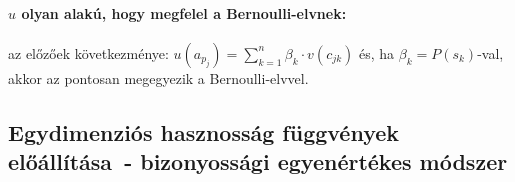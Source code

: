 \documentclass[a4paper,12pt]{article}
\begin{document}
\paragraph{$u$ olyan alakú, hogy megfelel a Bernoulli-elvnek:} az előzőek következménye: $u(a_{p_j}) = \sum^n_{k=1} \beta_k \cdot  v(c_{jk})$ és, ha $\beta_k = P(s_k)$-val, akkor az pontosan megegyezik a Bernoulli-elvvel.  






\subsection{Egydimenziós hasznosság függvények előállítása~- bizonyossági egyenértékes módszer}
\end{document}
